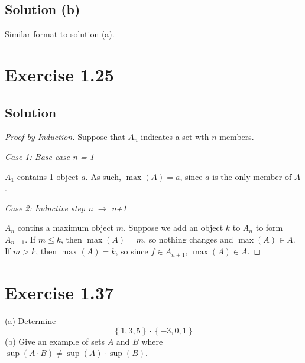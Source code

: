 \documentclass[12pt]{report}
\begin{document}
\subsection{Solution (b)}
    Similar format to solution (a).

\pagebreak
\section{Exercise 1.25}

\subsection*{Solution}
    \begin{proof}[Proof by Induction]
        Suppose that $A_n$ indicates a set wth $n$ members.

        \textit{Case 1: Base case n = 1}

        $A_1$ contains 1 object $a$. As such, $\max(A) = a$, since $a$ is the only member of $A$.

        \textit{Case 2: Inductive step n $\rightarrow$ n+1}

        $A_n$ contins a maximum object $m$.
        Suppose we add an object $k$ to $A_n$ to form $A_{n+1}$.
        If $m \leq k$, then $\max(A) = m$, so nothing changes and $\max(A) \in A$.
        If $m > k$, then $\max(A) = k$, so since $f \in A_{n+1}$, $\max(A) \in A$.
    \end{proof}

\pagebreak
\section{Exercise 1.37}
(a) Determine
\[ \left\{1,3,5\right\} \cdot \left\{-3,0,1\right\} \]
(b) Give an example of sets $A$ and $B$ where $\sup(A\cdot B) \ne \sup(A) \cdot \sup(B)$.
\end{document}
